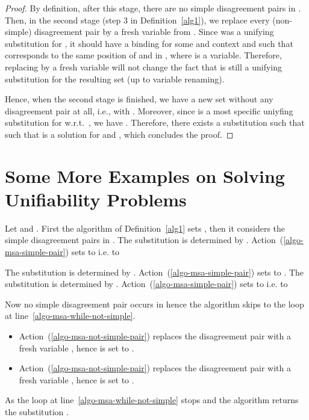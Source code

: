 \documentclass[fleqn]{tlp}
\begin{document}
\begin{appendix}
\begin{proof}
  By definition, after this stage, there are no simple disagreement
  pairs in . 
  Then, in the second stage (step 3 in Definition~\ref{alg1}), we replace
  every (non-simple) disagreement pair  by a fresh variable
   from . Since  was a unifying substitution for
  , it should have a binding  for some
   and context  and such that 
  corresponds to the same position of  and  in ,
  where  is a variable.  Therefore, replacing  by a fresh
  variable  will not change the fact that  is still a
  unifying substitution for the resulting set (up to variable
  renaming).

  Hence, when the second stage is finished, we have a new set
   without any disagreement pair at all, i.e.,
   with . Moreover, since  is a most
  specific uniyfing substitution for  w.r.t.\ , we have
  . Therefore, there exists a substitution
   such that  such that  is
  a solution for  and , which concludes the
  proof.
\end{proof}

\section{Some More Examples on Solving Unifiability Problems}

\begin{example}
  Let  and .
  First the algorithm of Definition~\ref{alg1} sets
  ,
  then it considers the simple disagreement pairs
  in . The substitution 
  is determined by . Action~(\ref{algo-msa-simple-pair})
  sets  to  i.e. to
  
  The substitution 
  is determined by . Action~(\ref{algo-msa-simple-pair})
  sets  to .
  The substitution  is determined by
  . Action~(\ref{algo-msa-simple-pair}) sets  to
   i.e. to
  
  Now no simple disagreement pair occurs in  hence the algorithm
  skips to the loop at line~\ref{algo-msa-while-not-simple}.
  \begin{itemize}
  \item Action~(\ref{algo-msa-not-simple-pair}) replaces 
    the disagreement pair  with a
    fresh variable , hence  is set to
    .
  \item Action~(\ref{algo-msa-not-simple-pair}) replaces 
    the disagreement pair 
    with a fresh variable , hence  is set to
    .
  \end{itemize}
  As  the loop at line~\ref{algo-msa-while-not-simple}
  stops and the algorithm returns the substitution .


\end{example}
\end{appendix}
\end{document}

